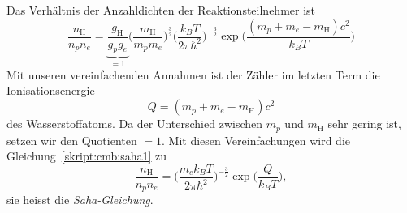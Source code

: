 Das Verhältnis der Anzahldichten der Reaktionsteilnehmer ist
\begin{equation}
\frac{n_\text{H}}{n_pn_e}
=
\underbrace{\frac{g_\text{H}}{g_pg_e}}_{\displaystyle=1}
\biggl(\frac{m_\text{H}}{m_pm_e}\biggr)^{\frac32}
\biggl(\frac{k_BT}{2\pi \hbar^2}\biggr)^{-\frac32}
\exp\biggl( \frac{(m_p+m_e-m_\text{H})c^2}{k_BT} \biggr)
\label{skript:cmb:saha1}
\end{equation}
Mit unseren vereinfachenden Annahmen ist der Zähler im letzten Term
die Ionisationsenergie
\[
Q=(m_p+m_e-m_\text{H})c^2
\]
des Wasserstoffatoms.
Da der Unterschied zwischen $m_p$ und $m_\text{H}$ sehr gering ist,
setzen wir den Quotienten $=1$.
Mit diesen Vereinfachungen wird die Gleichung~\eqref{skript:cmb:saha1}
zu
\begin{equation}
\frac{n_\text{H}}{n_pn_e}
=
\biggl(\frac{m_ek_BT}{2\pi \hbar^2}\biggr)^{-\frac32}
\exp\biggl( \frac{Q}{k_BT} \biggr),
\label{skript:cmb:saha}
\end{equation}
sie heisst die {\em Saha-Gleichung}.

